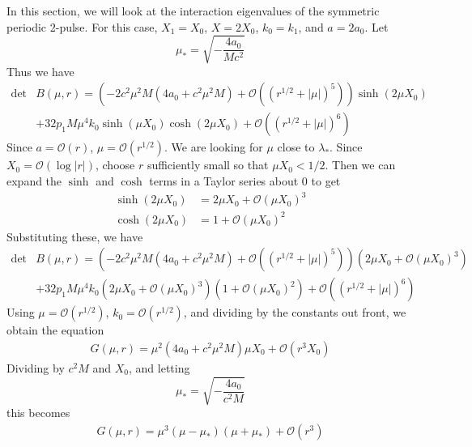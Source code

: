 \documentclass[thesis.tex]{subfiles}
\begin{document}
In this section, we will look at the interaction eigenvalues of the symmetric periodic 2-pulse. For this case, $X_1 = X_0$, $X = 2 X_0$, $k_0 = k_1$, and $a = 2 a_0$. Let
\[
\mu_* = \sqrt{-\frac{4a_0}{M c^2}}
\]
Thus we have
\begin{equation}\label{Bsymmetric1}
\begin{aligned}
\det &B(\mu, r) = \left(-2 c^2 \mu^2 M (4a_0 + c^2 \mu^2 M) +  \mathcal{O}( (r^{1/2} + |\mu|)^5 )\right) \sinh(2 \mu X_0) \\
&+32 p_1 M \mu^4 k_0\sinh(\mu X_0) \cosh(2 \mu X_0) + \mathcal{O}( (r^{1/2} + |\mu|)^6) 
\end{aligned}
\end{equation}
Since $a = \mathcal{O}(r)$, $\mu = \mathcal{O}(r^{1/2})$. We are looking for $\mu$ close to $\lambda_*$. Since $X_0 = \mathcal{O}(\log|r|)$, choose $r$ sufficiently small so that $\mu X_0 < 1/2$. Then we can expand the $\sinh$ and $\cosh$ terms in a Taylor series about 0 to get
\begin{align*}
\sinh(2\mu X_0) &= 2 \mu X_0 + \mathcal{O}\left(\mu X_0 \right)^3 \\
\cosh(2\mu X_0) &= 1 + \mathcal{O}\left(\mu X_0 \right)^2
\end{align*}
Substituting these, we have
\begin{equation}\label{Bsymmetric2}
\begin{aligned}
\det &B(\mu, r) = \left(-2 c^2 \mu^2 M (4a_0 + c^2 \mu^2 M) +  \mathcal{O}( (r^{1/2} + |\mu|)^5 )\right) \left( 2 \mu X_0 + \mathcal{O}\left(\mu X_0 \right)^3 \right) \\
&+32 p_1 M \mu^4 k_0 \left( 2 \mu X_0 + \mathcal{O}\left(\mu X_0 \right)^3 \right) \left( 1 + \mathcal{O}\left(\mu X_0 \right)^2 \right) + \mathcal{O}( (r^{1/2} + |\mu|)^6) 
\end{aligned}
\end{equation}
Using $\mu = \mathcal{O}(r^{1/2})$, $k_0 = \mathcal{O}(r^{1/2})$, and dividing by the constants out front, we obtain the equation
\begin{equation*}
\begin{aligned}
G(\mu, r) = \mu^2 (4a_0 + c^2 \mu^2 M) \mu X_0 + \mathcal{O}( r^3 X_0 ) 
\end{aligned}
\end{equation*}
Dividing by $c^2 M$ and $X_0$, and letting
\begin{equation}
\mu_* = \sqrt{- \frac{4 a_0}{c^2 M}}
\end{equation}
this becomes
\begin{equation*}
\begin{aligned}
G(\mu, r) = \mu^3 (\mu - \mu_*)(\mu + \mu_*) + \mathcal{O}( r^3 ) 
\end{aligned}
\end{equation*}
\end{document}

